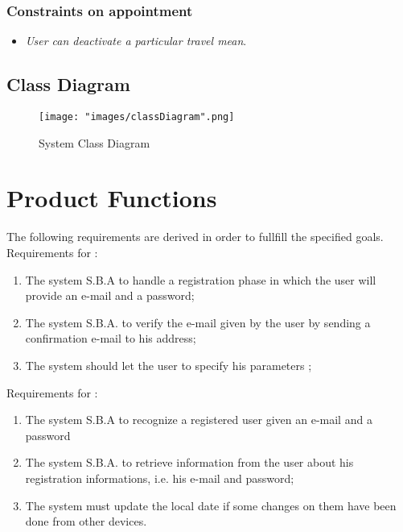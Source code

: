 \subsubsection{Constraints on appointment} \label{subsubsect:constronappoint}
\begin{itemize}
\item \textit{User can deactivate a particular travel mean}.
\end{itemize}

\subsection{Class Diagram}
\begin{figure}[H]
\begin{center}
\texttt{[image: "images/classDiagram".png]}
\caption{System Class Diagram}
\end{center}
\end{figure}

\section{Product Functions}

The following requirements are derived in order to fullfill the specified goals.\\

Requirements for :
\begin{enumerate}%
\renewcommand\labelenumi{\textbf{R\theenumi}}
\item The system S.B.A to handle a registration phase in which the user will provide an e-mail and a password; \label{req:R1}
\item The system S.B.A. to verify the e-mail given by the user by sending a confirmation e-mail to his address; \label{req:R2}
\item  The system should let the user to specify his parameters ;
\end{enumerate} \label{req:R3}

Requirements for :
\begin{enumerate}[resume]
\renewcommand\labelenumi{\textbf{R\theenumi}}
\item The system S.B.A to recognize a registered user given an e-mail and a password \label{req:R4}
\item The system S.B.A. to retrieve information from the user about his registration informations, i.e. his e-mail and password; \label{req:R5}
\item The system must update the local date if some changes on them have been done from other devices.
\end{enumerate}

